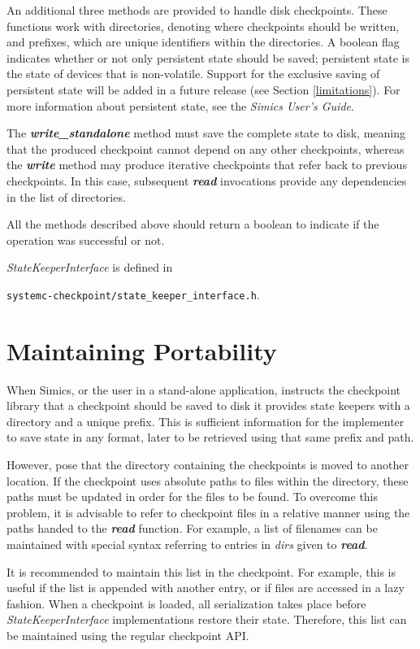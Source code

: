 \documentclass[oneside]{memoir}
\begin{document}
An additional three methods are provided to handle disk checkpoints.
These functions work with directories, denoting where checkpoints should be written, and prefixes, which are unique identifiers within the directories.
A boolean flag indicates whether or not only persistent state should be saved; persistent state is the state of devices that is non-volatile.
Support for the exclusive saving of persistent state will be added in a future release (see Section \ref{limitations}).
For more information about persistent state, see the \textit{Simics User's Guide}.

The \textit{\textbf{write\_standalone}} method must save the complete state to disk, meaning that the produced checkpoint cannot depend on any other checkpoints, whereas the \textit{\textbf{write}} method may produce iterative checkpoints that refer back to previous checkpoints.
In this case, subsequent \textit{\textbf{read}} invocations provide any dependencies in the list of directories.

All the methods described above should return a boolean to indicate if the operation was successful or not.

\textit{StateKeeperInterface} is defined in

\texttt{systemc-checkpoint/state\_keeper\_interface.h}.

\section{Maintaining Portability}
\label{portability}

When Simics, or the user in a stand-alone application, instructs the checkpoint library that a checkpoint should be saved to disk it provides state keepers with a directory and a unique prefix.
This is sufficient information for the implementer to save state in any format, later to be retrieved using that same prefix and path.

However, pose that the directory containing the checkpoints is moved to another location.
If the checkpoint uses absolute paths to files within the directory, these paths must be updated in order for the files to be found.
To overcome this problem, it is advisable to refer to checkpoint files in a relative manner using the paths handed to the \textit{\textbf{read}} function.
For example, a list of filenames can be maintained with special syntax referring to entries in \textit{dirs} given to \textit{\textbf{read}}.

It is recommended to maintain this list in the checkpoint.
For example, this is useful if the list is appended with another entry, or if files are accessed in a lazy fashion.
When a checkpoint is loaded, all serialization takes place before \textit{StateKeeperInterface} implementations restore their state.
Therefore, this list can be maintained using the regular checkpoint API.
\end{document}
